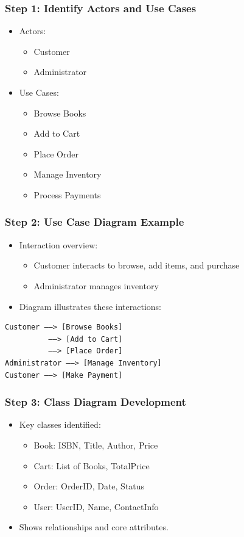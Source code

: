 \documentclass{beamer}
\begin{document}
\begin{frame}[fragile]
    \frametitle{Step 1: Identify Actors and Use Cases}
    \begin{itemize}
        \item Actors:
        \begin{itemize}
            \item Customer
            \item Administrator
        \end{itemize}
        \item Use Cases:
        \begin{itemize}
            \item Browse Books
            \item Add to Cart
            \item Place Order
            \item Manage Inventory
            \item Process Payments
        \end{itemize}
    \end{itemize}
\end{frame}

\begin{frame}[fragile]
    \frametitle{Step 2: Use Case Diagram Example}
    \begin{itemize}
        \item Interaction overview:
        \begin{itemize}
            \item Customer interacts to browse, add items, and purchase
            \item Administrator manages inventory
        \end{itemize}
        \item Diagram illustrates these interactions:
\end{itemize}
\begin{lstlisting}
Customer ——> [Browse Books]
          ——> [Add to Cart]
          ——> [Place Order]
Administrator ——> [Manage Inventory]
Customer ——> [Make Payment]
\end{lstlisting}
\end{frame}

\begin{frame}[fragile]
    \frametitle{Step 3: Class Diagram Development}
    \begin{itemize}
        \item Key classes identified:
        \begin{itemize}
            \item Book: ISBN, Title, Author, Price
            \item Cart: List of Books, TotalPrice
            \item Order: OrderID, Date, Status
            \item User: UserID, Name, ContactInfo
        \end{itemize}
        \item Shows relationships and core attributes.
    \end{itemize}
\end{frame}
\end{document}
